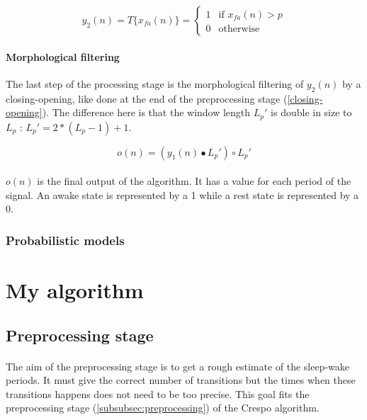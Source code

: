 \documentclass[a4paper,10pt]{article}
\begin{document}
\begin{equation}
y_2(n) = T\{x_{fa}(n)\} = \left\{
    \begin{array}{ll}
        1 & \mbox{if } x_{fa}(n) > p \\
        0 & \mbox{otherwise}
    \end{array}
\right.\end{equation}

\paragraph{Morphological filtering}
The last step of the processing stage is the morphological filtering of $y_2(n)$ by a closing-opening, like done at the end of the preprocessing stage (\ref{closing-opening}). The difference here is that the window length $L_p'$ is double in size to $L_p$ : $L_p' = 2 * (L_p - 1) + 1$.

\begin{equation}
o(n) = (y_1(n) \bullet L_p') \circ L_p'
\end{equation}

\paragraph{}
$o(n)$ is the final output of the algorithm. It has a value for each period of the signal. An awake state is represented by a 1 while a rest state is represented by a 0.

\subsubsection{Probabilistic models}
\label{subsubsec:crespoProb}

\section{My algorithm}
\subsection{Preprocessing stage}

\paragraph{}
The aim of the preprocessing stage is to get a rough estimate of the sleep-wake periods. It must give the correct number of transitions but the times when these transitions happens does not need to be too precise. This goal fits the preprocessing stage (\ref{subsubsec:preprocessing}) of the Crespo algorithm.
\end{document}
